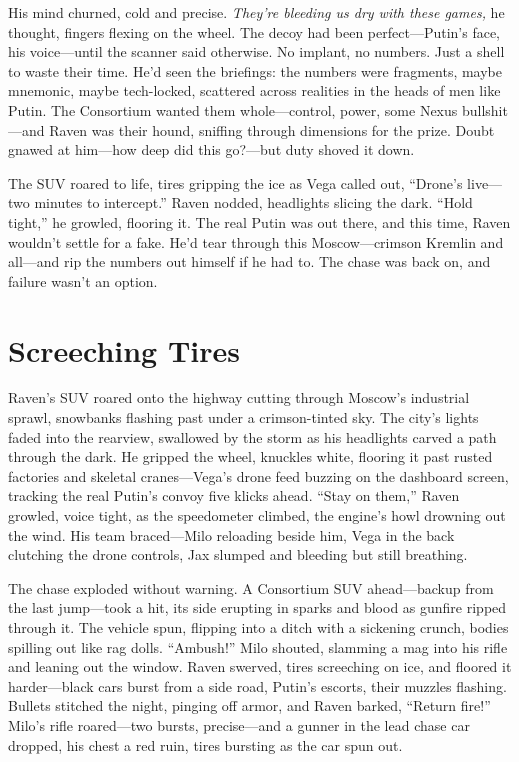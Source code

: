 \documentclass[12pt]{book}
\begin{document}
His mind churned, cold and precise. \textit{They’re bleeding us dry with these games,} he thought, fingers flexing on the wheel. The decoy had been perfect—Putin’s face, his voice—until the scanner said otherwise. No implant, no numbers. Just a shell to waste their time. He’d seen the briefings: the numbers were fragments, maybe mnemonic, maybe tech-locked, scattered across realities in the heads of men like Putin. The Consortium wanted them whole—control, power, some Nexus bullshit—and Raven was their hound, sniffing through dimensions for the prize. Doubt gnawed at him—how deep did this go?—but duty shoved it down.

The SUV roared to life, tires gripping the ice as Vega called out, “Drone’s live—two minutes to intercept.” Raven nodded, headlights slicing the dark. “Hold tight,” he growled, flooring it. The real Putin was out there, and this time, Raven wouldn’t settle for a fake. He’d tear through this Moscow—crimson Kremlin and all—and rip the numbers out himself if he had to. The chase was back on, and failure wasn’t an option.


\section{Screeching Tires}

Raven’s SUV roared onto the highway cutting through Moscow’s industrial sprawl, snowbanks flashing past under a crimson-tinted sky. The city’s lights faded into the rearview, swallowed by the storm as his headlights carved a path through the dark. He gripped the wheel, knuckles white, flooring it past rusted factories and skeletal cranes—Vega’s drone feed buzzing on the dashboard screen, tracking the real Putin’s convoy five klicks ahead. “Stay on them,” Raven growled, voice tight, as the speedometer climbed, the engine’s howl drowning out the wind. His team braced—Milo reloading beside him, Vega in the back clutching the drone controls, Jax slumped and bleeding but still breathing.

The chase exploded without warning. A Consortium SUV ahead—backup from the last jump—took a hit, its side erupting in sparks and blood as gunfire ripped through it. The vehicle spun, flipping into a ditch with a sickening crunch, bodies spilling out like rag dolls. “Ambush!” Milo shouted, slamming a mag into his rifle and leaning out the window. Raven swerved, tires screeching on ice, and floored it harder—black cars burst from a side road, Putin’s escorts, their muzzles flashing. Bullets stitched the night, pinging off armor, and Raven barked, “Return fire!” Milo’s rifle roared—two bursts, precise—and a gunner in the lead chase car dropped, his chest a red ruin, tires bursting as the car spun out.
\end{document}

